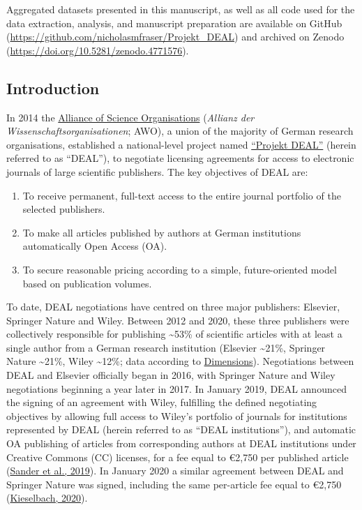 \documentclass[
]{article}
\providecommand{\tightlist}{%
  \setlength{\itemsep}{0pt}\setlength{\parskip}{0pt}}
\begin{document}
Aggregated datasets presented in this manuscript, as well as all code used for the data extraction, analysis, and manuscript preparation are available on GitHub (\url{https://github.com/nicholasmfraser/Projekt_DEAL}) and archived on Zenodo (\url{https://doi.org/10.5281/zenodo.4771576}).

\pagebreak

\hypertarget{introduction}{%
\subsection{Introduction}\label{introduction}}

In 2014 the \href{https://wissenschaftsfreiheit.de/}{Alliance of Science Organisations} (\emph{Allianz der Wissenschaftsorganisationen}; AWO), a union of the majority of German research organisations, established a national-level project named \href{https://www.projekt-deal.de}{``Projekt DEAL''} (herein referred to as ``DEAL''), to negotiate licensing agreements for access to electronic journals of large scientific publishers. The key objectives of DEAL are:

\begin{enumerate}
\def\labelenumi{\arabic{enumi}.}
\tightlist
\item
  To receive permanent, full-text access to the entire journal portfolio of the selected publishers.
\item
  To make all articles published by authors at German institutions automatically Open Access (OA).
\item
  To secure reasonable pricing according to a simple, future-oriented model based on publication volumes.
\end{enumerate}

To date, DEAL negotiations have centred on three major publishers: Elsevier, Springer Nature and Wiley. Between 2012 and 2020, these three publishers were collectively responsible for publishing \textasciitilde53\% of scientific articles with at least a single author from a German research institution (Elsevier \textasciitilde21\%, Springer Nature \textasciitilde21\%, Wiley \textasciitilde12\%; data according to \href{https://www.dimensions.ai/}{Dimensions}). Negotiations between DEAL and Elsevier officially began in 2016, with Springer Nature and Wiley negotiations beginning a year later in 2017. In January 2019, DEAL announced the signing of an agreement with Wiley, fulfilling the defined negotiating objectives by allowing full access to Wiley's portfolio of journals for institutions represented by DEAL (herein referred to as ``DEAL institutions''), and automatic OA publishing of articles from corresponding authors at DEAL institutions under Creative Commons (CC) licenses, for a fee equal to €2,750 per published article (\href{https://doi.org/10.17617/2.3027595}{Sander et al., 2019}). In January 2020 a similar agreement between DEAL and Springer Nature was signed, including the same per-article fee equal to €2,750 (\href{https://doi.org/10.17617/2.3174351}{Kieselbach, 2020}).
\end{document}
